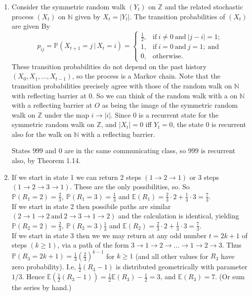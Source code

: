 \documentclass[11pt,a4paper]{article}
\begin{document}
\begin{enumerate}
        \item Consider the symmetric random walk $(Y_t)$ on $\mathbb{Z}$ and the related stochastic process $(X_t)$ on $\mathbb{N}$ given by $X_t = |Y_t|$. The transition probabilities of $(X_t)$ are given By
        $$
        p_{ij}
        =
        \mathbb{P}(X_{t+1} = j\, | \, X_t = i)
        =
        \begin{cases}
            \frac{1}{2}, & \text{if}\ i \neq 0\ \text{and}\ |j-i| = 1;\\
            1, & \text{if}\ i = 0\ \text{and}\ j = 1;\ \text{and}\\
            0, & \text{otherwise}.
        \end{cases}
        $$
        These transition probabilities do not depend on the past history $(X_0, X_1, \ldots, X_{t-1})$, so the process is a Markov chain. Note that the transition probabilities precisely agree with those of the random walk on $\mathbb{N}$ with reflecting barrier at $0$. So we can think of the random walk with a on $\mathbb{N}$ with a reflecting barrier at $O$ as being the image of the symmetric random walk on $\mathbb{Z}$ under the map $i \to |i|$. Since $0$ is a recurrent state for the symmetric random walk on $\mathbb{Z}$, and $|X_t| = 0$ iff $Y_t = 0$, the state $0$ is recurrent also for the walk on $\mathbb{N}$ with a reflecting barrier.\par 
        States $999$ and $0$ are in thc same communicating class, so $999$ is recurrent also, by Theorem 1.14.
        \item If we start in state 1 we can return 2 steps $(1 \to 2 \to 1)$ or 3 steps $(1 \to 2 \to 3 \to 1)$. These are the only possibilities, so. So $\mathbb{P}(R_1 = 2)=\frac{2}{3},\ \mathbb{P}(R_1 = 3)=\frac{1}{3}$ and $\mathbb{E}(R_1) = \frac{2}{3}\cdot 2+\frac{1}{3}\cdot 3 = \frac{7}{3}$.\\
        If we start in state 2 then possibile paths are similar $(2 \to 1 \to 2\ \text{and}\ 2 \to 3 \to 1 \to 2)$ and the calculation is identical, yielding $\mathbb{P}(R_2 = 2) = \frac{2}{3},\ \mathbb{P}(R_2=3) \frac{1}{3}$ and $\mathbb{E}(R_2) = \frac{2}{3}\cdot 2 + \frac{1}{3}\cdot 3 = \frac{7}{3}$.\\
        If we start in state 3 then we we may return at any odd number $t = 2k+1$ of steps $(k \geq 1)$, via a path of the form $3 \to 1 \to 2 \to \ldots \to 1 \to 2 \to 3$. Thus $\mathbb{P}(R_3 = 2k+1) = \frac{1}{3}\left(\frac{2}{3}\right)^{k-1}$ for $k \geq 1$ (and all other values for $R_3$ have zero probability). I.e, $\frac{1}{2}(R_3-1)$ is distributed geometrically with parameter $1/3$. Hence $\mathbb{E}(\frac{1}{2}(R_3-1)) = \frac{1}{2}\mathbb{E}(R_3) - \frac{1}{2} = 3$, and $\mathbb{E}(R_3) = 7$. (Or sum the series by hand.)\\

\end{enumerate}
\end{document}
